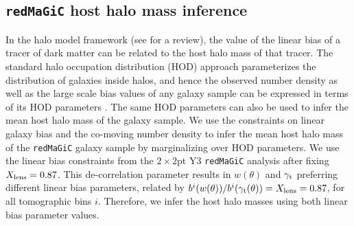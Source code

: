 \documentclass[aps, prd,twocolumn,superscriptaddress,nofootinbib,preprintnumbers]{revtex4-1}
\newcommand{\redmagic}{\texttt{redMaGiC} }
\begin{document}
\subsection{\redmagic host halo mass inference}

In the halo model framework (see \cite{COORAY_2002} for a review), the value of the linear bias of a tracer of dark matter can be related to the host halo mass of that tracer. The standard halo occupation distribution (HOD) approach parameterizes the distribution of  galaxies inside  halos, and hence the observed number density as well as the large scale bias values of any galaxy sample can be expressed in terms of its HOD parameters \citep{Berlind_2002, Zheng_2005, Zehavi_2011}. The same HOD parameters can also be used to infer the mean host halo mass of the galaxy sample. We use the constraints on  linear galaxy bias and the co-moving number density to infer the mean host halo mass of the \redmagic galaxy sample by marginalizing over HOD parameters. We use the linear bias constraints from the $2\times2$pt Y3 \redmagic analysis after fixing $X_{\rm lens}=0.87$. This de-correlation parameter results in $w(\theta)$ and $\gamma_{\rm t}$ preferring different linear bias parameters, related by $b^{i}(w(\theta))/b^{i}(\gamma_{\rm t}(\theta)) = X_{\rm lens} = 0.87$, for all tomographic bins $i$. Therefore, we infer the host halo masses using both linear bias parameter values. 
\end{document}
